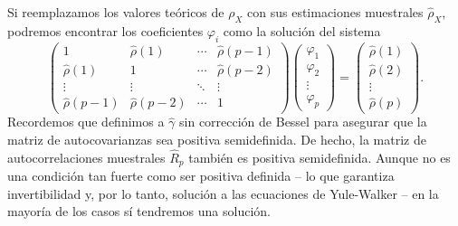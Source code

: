 \documentclass[11pt,letterpaper]{article}
\theoremstyle{definition}
\theoremstyle{theorem}
\theoremstyle{remark}
\begin{document}
	Si reemplazamos los valores teóricos de \(\rho_X\) con sus estimaciones muestrales \(\hat{\rho}_X\), podremos encontrar los coeficientes \(\varphi_i\) como la solución del sistema \[\begin{pmatrix}1&\hat{\rho}(1)&\cdots& \hat{\rho}(p-1)\\\hat{\rho}(1)&1&\cdots&\hat{\rho}(p-2)\\\vdots&\vdots&\ddots&\vdots\\\hat{\rho}(p-1)&\hat{\rho}(p-2)&\cdots&1\end{pmatrix}\begin{pmatrix}\varphi_1\\\varphi_2\\\vdots\\\varphi_p\end{pmatrix}=\begin{pmatrix}\hat{\rho}(1)\\\hat{\rho}(2)\\\vdots\\\hat{\rho}(p)\end{pmatrix}.\]\indent Recordemos que definimos a \(\hat{\gamma}\) sin corrección de Bessel para asegurar que la matriz de autocovarianzas sea positiva semidefinida. De hecho, la matriz de autocorrelaciones muestrales \(\hat{R}_p\) también es positiva semidefinida. Aunque no es una condición tan fuerte como ser positiva definida -- lo que garantiza invertibilidad y, por lo tanto, solución a las ecuaciones de Yule-Walker -- en la mayoría de los casos sí tendremos una solución.
\end{document}
